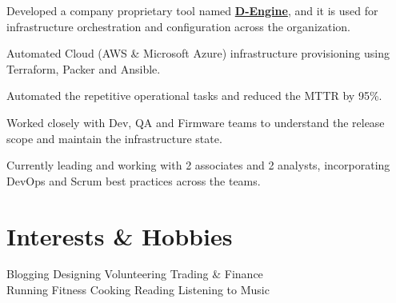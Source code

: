 \documentclass[a4paper]{deedy-resume-openfont}
\begin{document}
\begin{minipage}[t]{0.66\textwidth}
\begin{tightemize}
\item Developed a company proprietary tool named \href{https://www.youtube.com/watch?v=YWLU2OU13tA}{\bf D-Engine}, and it is used for infrastructure orchestration and configuration across the organization.
\item Automated Cloud (AWS \& Microsoft Azure) infrastructure provisioning using Terraform, Packer and Ansible.
\item Automated the repetitive operational tasks and reduced the MTTR by 95\%.
\item Worked closely with Dev, QA and Firmware teams to understand the release scope and maintain the infrastructure state.
\item Currently leading and working with 2 associates and 2 analysts, incorporating DevOps and Scrum best practices across the teams.
\end{tightemize}
\sectionsep


\section{Interests \& Hobbies}
Blogging \textbullet{} Designing \textbullet{} Volunteering \textbullet{} Trading \& Finance \\
Running \textbullet{} Fitness \textbullet{} Cooking \textbullet{} Reading  \textbullet{} Listening to Music


\end{minipage} 


\hfill

\vspace{\topsep}
\vspace{\topsep}
\vspace{\topsep}
\vspace{\topsep}
\end{document}
